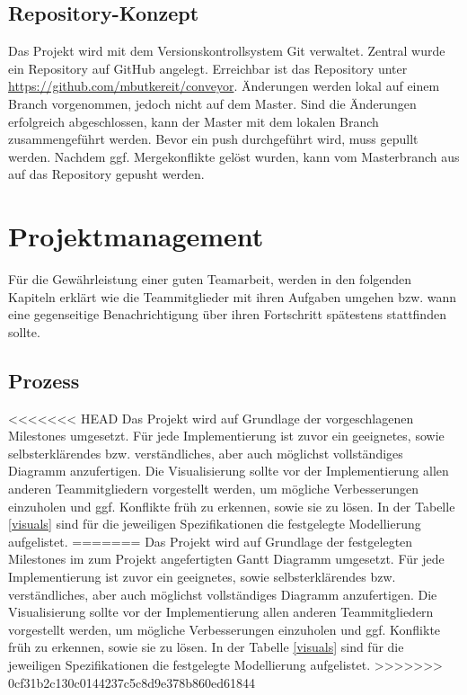\documentclass[a4paper, 11pt]{article}
\begin{document}
\newpage

\subsection{Repository-Konzept}
Das Projekt wird mit dem Versionskontrollsystem Git verwaltet. Zentral wurde ein Repository auf GitHub angelegt. Erreichbar ist das Repository unter \url{https://github.com/mbutkereit/conveyor}. Änderungen werden lokal auf einem Branch vorgenommen, jedoch nicht auf dem Master. Sind die Änderungen erfolgreich abgeschlossen, kann der Master mit dem lokalen Branch zusammengeführt werden. Bevor ein push durchgeführt wird, muss gepullt werden. Nachdem ggf. Mergekonflikte gelöst wurden, kann vom Masterbranch aus auf das Repository gepusht werden.

\section{Projektmanagement}
Für die Gewährleistung einer guten Teamarbeit, werden in den folgenden Kapiteln erklärt wie die Teammitglieder mit ihren Aufgaben umgehen bzw. wann eine gegenseitige Benachrichtigung über ihren Fortschritt spätestens stattfinden sollte.

\subsection{Prozess}
<<<<<<< HEAD
Das Projekt wird auf Grundlage der vorgeschlagenen Milestones umgesetzt. Für jede Implementierung ist zuvor ein geeignetes, sowie selbsterklärendes bzw. verständliches, aber auch möglichst vollständiges Diagramm anzufertigen. Die Visualisierung sollte vor der Implementierung allen anderen Teammitgliedern vorgestellt werden, um mögliche Verbesserungen einzuholen und ggf. Konflikte früh zu erkennen, sowie sie zu lösen. In der Tabelle \ref{visuals} sind für die jeweiligen Spezifikationen die festgelegte Modellierung aufgelistet.
=======
Das Projekt wird auf Grundlage der festgelegten Milestones im zum Projekt angefertigten Gantt Diagramm umgesetzt. Für jede Implementierung ist zuvor ein geeignetes, sowie selbsterklärendes bzw. verständliches, aber auch möglichst vollständiges Diagramm anzufertigen. Die Visualisierung sollte vor der Implementierung allen anderen Teammitgliedern vorgestellt werden, um mögliche Verbesserungen einzuholen und ggf. Konflikte früh zu erkennen, sowie sie zu lösen. In der Tabelle \ref{visuals} sind für die jeweiligen Spezifikationen die festgelegte Modellierung aufgelistet.
>>>>>>> 0cf31b2c130c0144237c5c8d9e378b860ed61844
\end{document}
